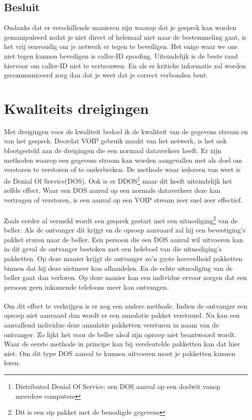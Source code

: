 \documentclass[pdftex,a4paper,12pt,twoside]{report}
\begin{document}
\subsection{Besluit}
Ondanks dat er verschillende manieren zijn waarop dat je gesprek kan worden gemanipuleerd zodat je niet direct of helemaal niet naar de bestemmeling gaat, is het vrij eenvoudig om je netwerk er tegen te beveiligen. Het enige waar we ons niet tegen kunnen beveiligen is caller-ID spoofing. Uiteindelijk is de beste raad hiervoor om caller-ID niet te vertrouwen. En als er kritieke informatie zal worden gecommuniceerd zorg dan dat je weet dat je correct verbonden bent. 
\newpage

\section{Kwaliteits dreigingen}
Met dreigingen voor de kwaliteit bedoel ik de kwaliteit van de gegevens stream en van het gesprek. Doordat VOIP gebruik maakt van het netwerk, is het ook blootgesteld aan de dreigingen die een normaal dataverkeer heeft. Er zijn methoden waarop een gegevens stroom  kan worden aangevallen met als doel om verstoren te verstoren of te onderbreken. De methode waar iedereen van weet is de Denial Of Service(DOS). Ook is er DDOS\footnote{Distributed Denial Of Service: een DOS aanval op een doelwit vanop meerdere computers} maar dit heeft uiteindelijk het zelfde effect. Waar een DOS aanval op een normale dataverkeer deze kan vertragen of verstoren, is een aanval op een VOIP stream zeer snel zeer effectief. 
\\ \\
Zoals eerder al vermeld wordt een gesprek gestart met een uitnodiging\footnote{Dit is een sip pakket met de benodigde gegevens} van de beller. Als de ontvanger dit krijgt en de oproep aanvaard zal hij een bevestiging's pakket sturen naar de beller. Een persoon die een DOS aanval wil uitvoeren kan in dit geval de ontvanger bestoken met een heleboel van die uitnodiging's pakketten. Op deze manier krijgt de ontvanger zo'n grote hoeveelheid pakketten binnen dat hij deze nietmeer kan afhandelen. En de echte uitnodiging van de beller gaat dan verloren. Op deze manier kan een individue ervoor zorgen dat een persoon geen inkomende telefoons meer kan ontvangen.
\\ \\
Om dit effect te verkrijgen is er nog een andere methode. Indien de ontvanger een oproep niet aanvaard dan wordt er een annulatie pakket verstuurd. Nu kan een aanvallend individue deze annulatie pakketten versturen in naam van de ontvanger. Zo lijkt het voor de beller alsof zijn oproep niet beantwoord wordt. Waar de eerste methode in principe kan bij versleutelde pakketten kan dat hier niet. Om dit type DOS aanval te kunnen uitvoeren moet je pakketten kunnen lezen.
\end{document}
